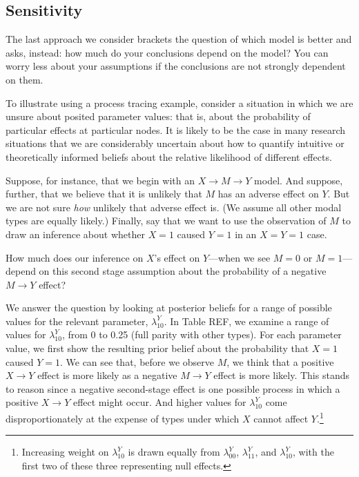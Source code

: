 \documentclass[
  12pt,
]{book}
\begin{document}
\hypertarget{sensitivity}{%
\subsection{Sensitivity}\label{sensitivity}}

The last approach we consider brackets the question of which model is better and asks, instead: how much do your conclusions depend on the model? You can worry less about your assumptions if the conclusions are not strongly dependent on them.

To illustrate using a process tracing example, consider a situation in which we are unsure about posited parameter values: that is, about the probability of particular effects at particular nodes. It is likely to be the case in many research situations that we are considerably uncertain about how to quantify intuitive or theoretically informed beliefs about the relative likelihood of different effects.

Suppose, for instance, that we begin with an \(X \rightarrow M \rightarrow Y\) model. And suppose, further, that we believe that it is unlikely that \(M\) has an adverse effect on \(Y\). But we are not sure \emph{how} unlikely that adverse effect is. (We assume all other modal types are equally likely.) Finally, say that we want to use the observation of \(M\) to draw an inference about whether \(X=1\) caused \(Y=1\) in an \(X=Y=1\) case.

How much does our inference on \(X\)'s effect on \(Y\)---when we see \(M=0\) or \(M=1\)---depend on this second stage assumption about the probability of a negative \(M \rightarrow Y\) effect?

We answer the question by looking at posterior beliefs for a range of possible values for the relevant parameter, \(\lambda^Y_{10}\). In Table REF, we examine a range of values for \(\lambda^Y_{10}\), from 0 to 0.25 (full parity with other types). For each parameter value, we first show the resulting prior belief about the probability that \(X=1\) caused \(Y=1\). We can see that, before we observe \(M\), we think that a positive \(X \rightarrow Y\) effect is more likely as a negative \(M \rightarrow Y\) effect is more likely. This stands to reason since a negative second-stage effect is one possible process in which a positive \(X \rightarrow Y\) effect might occur. And higher values for \(\lambda^Y_{10}\) come disproportionately at the expense of types under which \(X\) cannot affect \(Y\).\footnote{Increasing weight on \(\lambda^Y_{10}\) is drawn equally from \(\lambda^Y_{00}\), \(\lambda^Y_{11}\), and \(\lambda^Y_{10}\), with the first two of these three representing null effects.}
\end{document}
